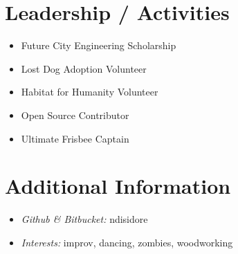 \documentclass[10pt]{article}
\begin{document}
\section*{Leadership / Activities}
\begin{multicols}{2}
  \begin{itemize}
    \item Future City Engineering Scholarship
    \item Lost Dog Adoption Volunteer
    \item Habitat for Humanity Volunteer
    \item Open Source Contributor
    \item Ultimate Frisbee Captain
  \end{itemize}
\end{multicols}

\section*{Additional Information}
\begin{multicols}{2}
  \begin{itemize}
    \item \textit{Github \& Bitbucket:} ndisidore
    \item \textit{Interests:} improv, dancing, zombies, woodworking
  \end{itemize}
\end{multicols}
\end{document}
